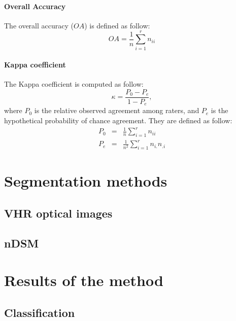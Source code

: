 \paragraph{Overall Accuracy \\}
The overall accuracy ($OA$) is defined as follow:
\begin{equation}
OA=\frac{1}{n}\sum_{i=1}^{r}n_{ii}
\end{equation}

\paragraph{Kappa coefficient\\} %
The Kappa coefficient is computed as follow:
\begin{equation}
\kappa=\frac{P_{0}-P_{e}}{1-P_{e}},
\end{equation}
where $P_{0}$ is the relative observed agreement among raters, and $P_{e}$ is the hypothetical probability of chance agreement. They are defined as follow:
\begin{eqnarray}
P_{0} & = & \frac{1}{n}\sum_{i=1}^{r}n_{ii} \\
P_{e} & = & \frac{1}{n^{2}}\sum_{i=1}^{r}n_{i.}n_{.i}
\end{eqnarray}

\section{Segmentation methods}


\subsection{VHR optical images}



\subsection{nDSM}



\section{Results of the method}
\subsection{Classification}

